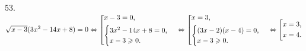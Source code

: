 53. $\sqrt{x-3}(3x^2-14x+8)=0\Leftrightarrow\left[\begin{gathered}
     x-3=0,\hfill\\
     \begin{cases}3x^2-14x+8=0,\\x-3\geqslant0.\end{cases}\hfill \end{gathered}\right.\Leftrightarrow\left[\begin{gathered}
     x=3,\hfill\\
     \begin{cases}(3x-2)(x-4)=0,\\x-3\geqslant0.\end{cases}\hfill \end{gathered}\right.\Leftrightarrow\left[\begin{gathered}
     x=3,\hfill\\
     x=4.\hfill \end{gathered}\right.$\\
